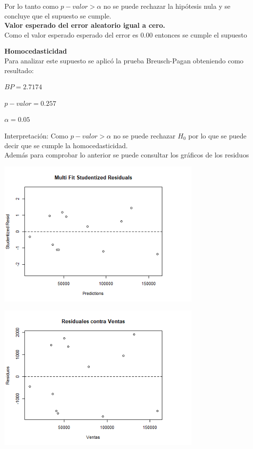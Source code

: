 \documentclass[12pt,a4paper]{article}
\begin{document}
	Por lo tanto como $p-valor > \alpha$ no se puede rechazar la hipótesis nula y se concluye que el supuesto se cumple.\\
	
	\textbf{Valor esperado del error aleatorio igual a cero.}\\
	Como el valor esperado esperado del error es 0.00 entonces se cumple el supuesto
	
	\textbf{Homocedasticidad}\\
	Para analizar este supuesto se aplicó la prueba Breusch-Pagan obteniendo como resultado:
	
	\begin{center}
		$BP = 2.7174$
		
		$p-valor = 0.257$
		
		$\alpha = 0.05$
	\end{center}
	
	Interpretación: Como $p-valor > \alpha$ no se puede rechazar $H_0$ por lo que se puede decir que se cumple la homocedasticidad.\\
	
	Además para comprobar lo anterior se puede consultar los gráficos de los residuos 
	
	\begin{center}
		\includegraphics[width=4in]{./images/MFDR1.png}
	\end{center}
	
	\begin{center}
		\includegraphics[width=4in]{./images/RVV1.png}
	\end{center}
	
\end{document}
